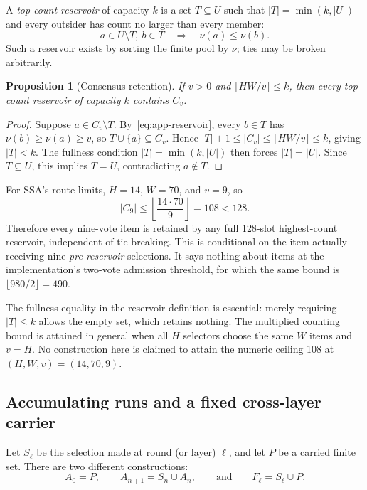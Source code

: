 \documentclass[11pt]{article}
\numberwithin{equation}{section}
\newtheorem{proposition}{Proposition}
\begin{document}
A \emph{top-count reservoir} of capacity $k$ is a set $T\subseteq U$ such that
$|T|=\min(k,|U|)$ and every outsider has count no larger than every member:
\begin{equation}\label{eq:app-reservoir}
a\in U\setminus T,\ b\in T\quad\Longrightarrow\quad\nu(a)\le\nu(b).
\end{equation}
Such a reservoir exists by sorting the finite pool by $\nu$; ties may be broken arbitrarily.

\begin{proposition}[Consensus retention]\label{prop:app-consensus-retention}
If $v>0$ and $\lfloor HW/v\rfloor\le k$, then every top-count reservoir of capacity $k$ contains $C_v$.
\end{proposition}
\begin{proof}
Suppose $a\in C_v\setminus T$. By~\eqref{eq:app-reservoir}, every $b\in T$ has
$\nu(b)\ge\nu(a)\ge v$, so $T\cup\{a\}\subseteq C_v$. Hence
$|T|+1\le|C_v|\le\lfloor HW/v\rfloor\le k$, giving $|T|<k$. The fullness condition
$|T|=\min(k,|U|)$ then forces $|T|=|U|$. Since $T\subseteq U$, this implies $T=U$, contradicting
$a\notin T$.
\end{proof}

For SSA's route limits, $H=14$, $W=70$, and $v=9$, so
\[
|C_9|\le\left\lfloor\frac{14\cdot70}{9}\right\rfloor=108<128.
\]
Therefore every nine-vote item is retained by any full 128-slot highest-count reservoir, independent of tie
breaking. This is conditional on the item actually receiving nine \emph{pre-reservoir} selections. It says
nothing about items at the implementation's two-vote admission threshold, for which the same bound is
$\lfloor980/2\rfloor=490$.

The fullness equality in the reservoir definition is essential: merely requiring $|T|\le k$ allows the empty
set, which retains nothing. The multiplied counting bound is attained in general when all $H$ selectors choose
the same $W$ items and $v=H$. No construction here is claimed to attain the numeric ceiling 108 at
$(H,W,v)=(14,70,9)$.

\subsection{Accumulating runs and a fixed cross-layer carrier}

Let $S_\ell$ be the selection made at round (or layer) $\ell$, and let $P$ be a carried finite set. There are
two different constructions:
\begin{equation}\label{eq:app-runs}
A_0=P,\qquad A_{n+1}=S_n\cup A_n,
\qquad\text{and}\qquad
F_\ell=S_\ell\cup P.
\end{equation}
\end{document}
